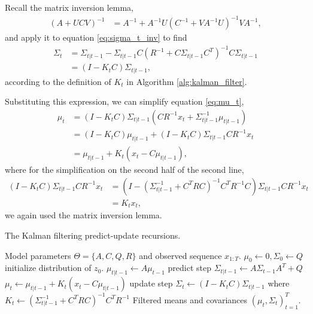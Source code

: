 \documentclass{article}
\begin{document}
Recall the matrix inversion lemma,
\begin{align*}
\left(A + UCV\right)^{-1} &= A^{-1} + A^{-1}U\left(C^{-1} + VA^{-1}U\right)^{-1}VA^{-1},
\end{align*}
and apply it to equation \ref{eq:sigma_t_inv} to find
\begin{align*}
  \Sigma_{t} &= \Sigma_{t \vert t - 1} - \Sigma_{t \vert t - 1}C\left(R^{-1} + C \Sigma_{t \vert t - 1}C^{T}\right)^{-1}C\Sigma_{t \vert t - 1} \\
  &= \left(I - K_{t}C\right)\Sigma_{t \vert t - 1},
\end{align*}
according to the definition of $K_{t}$ in Algorithm
\ref{alg:kalman_filter}.

Substituting this expression, we can simplify equation \ref{eq:mu_t},
\begin{align*}
  \mu_{t} &= \left(I - K_{t} C\right)\Sigma_{t \vert t - 1}\left(C R^{-1}x_{t} + \Sigma_{t \vert t - 1}^{-1} \mu_{t \vert t - 1}\right) \\
  &= \left(I - K_{t}C\right)\mu_{t \vert t - 1} + \left(I - K_{t} C\right)\Sigma_{t \vert t - 1}C R^{-1} x_{t} \\
  &= \mu_{t \vert t - 1} + K_{t}\left(x_{t} - C\mu_{t \vert t- 1}\right),
\end{align*}
where for the simplification on the second half of the second line,
\begin{align*}
  \left(I - K_{t}C\right)\Sigma_{t \vert t - 1} C R^{-1} x_{t} &= \left(I - \left(\Sigma_{t \vert t - 1}^{-1} + C^{T} R C\right)^{-1}C^{T}R^{-1}C\right)\Sigma_{t \vert t - 1}C R^{-1} x_{t} \\
  &= K_{t}x_{t},
\end{align*}
we again used the matrix inversion lemma.

\begin{algorithm}
   \caption{The Kalman filtering predict-update recursions.}
   \label{alg:kalman_filter}
\begin{algorithmic}
   Model parameters $\Theta = \{A, C, Q, R\}$ and
    observed sequence $x_{1:T}$.
    \STATE $\mu_{0} \leftarrow 0, \Sigma_{0} \leftarrow Q$ \hfill initialize distribution of
    $z_{0}$.
    \STATE $\mu_{t \vert t - 1} \leftarrow A\mu_{t - 1}$ \hfill predict step
    \STATE $\Sigma_{t \vert t - 1} \leftarrow A \Sigma_{t - 1} A^{T} + Q$
    \STATE $\mu_{t} \leftarrow \mu_{t \vert t - 1} + K_{t}\left(x_{t} - C\mu_{t \vert t - 1}\right)$ \hfill update step
    \STATE $\Sigma_{t} \leftarrow \left(I - K_{t}C\right)\Sigma_{t \vert t - 1}$
    \STATE where $K_{t} \leftarrow \left(\Sigma_{t \vert t - 1}^{-1} + C^{T}R C\right)^{-1} C^{T}R^{-1}$
    \ENDFOR
     Filtered means and covariances $\left(\mu_{t},
    \Sigma_{t}\right)_{t = 1}^{T}$.
\end{algorithmic}
\end{algorithm}
\end{document}
